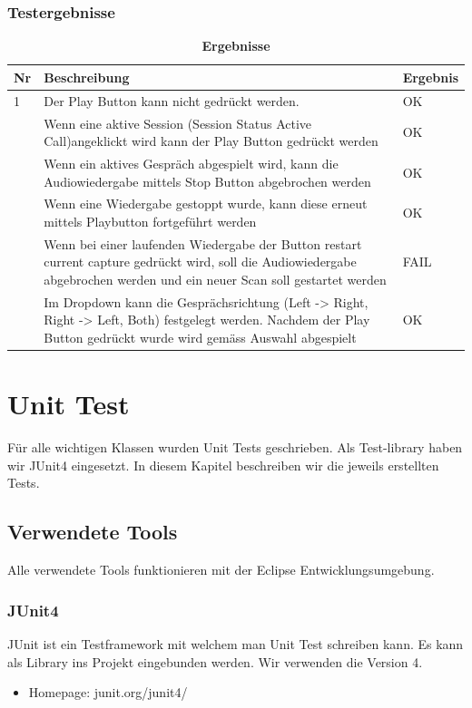 \documentclass[a4,12pt]{scrartcl}
\begin{document}
\subsubsection{Testergebnisse}
\begin{table}[H]
\centering
    \begin{tabular}{@{} p{0.5cm} p{11cm} p{2cm} @{}}\toprule    
    {Nr} & {Beschreibung} & {Ergebnis}\\ \midrule
    1 & Der Play Button kann nicht gedrückt werden. & OK\\ \addlinespace
   	2 & Wenn eine aktive Session (Session Status Active Call)angeklickt wird kann der Play Button gedrückt werden & OK\\ \addlinespace
   	3 & Wenn ein aktives Gespräch abgespielt wird, kann die Audiowiedergabe mittels Stop Button abgebrochen werden & OK\\ \addlinespace
   	4 & Wenn eine Wiedergabe gestoppt wurde, kann diese erneut mittels Playbutton fortgeführt werden & OK\\ \addlinespace
    5 & Wenn bei einer laufenden Wiedergabe der Button restart current capture gedrückt wird, soll die Audiowiedergabe abgebrochen werden und ein neuer Scan soll gestartet werden & FAIL\\ \addlinespace
    6 & Im Dropdown kann die Gesprächsrichtung (Left -> Right, Right -> Left, Both) festgelegt werden. Nachdem der Play Button gedrückt wurde wird gemäss Auswahl abgespielt & OK\\    
    \bottomrule
    \end{tabular}
\caption{\textbf{Ergebnisse}}
\end{table}
\newpage

\section{Unit Test}
Für alle wichtigen Klassen wurden Unit Tests geschrieben. Als Test-library haben wir JUnit4 eingesetzt. In diesem Kapitel beschreiben wir die jeweils erstellten Tests.  
\subsection{Verwendete Tools}
Alle verwendete Tools funktionieren mit der Eclipse Entwicklungsumgebung. 
\subsubsection{JUnit4}
JUnit ist ein Testframework mit welchem man Unit Test schreiben kann. Es kann als Library ins Projekt eingebunden werden. Wir verwenden die Version 4.
\begin{itemize}
\item Homepage: junit.org/junit4/
\end{itemize}
\end{document}
